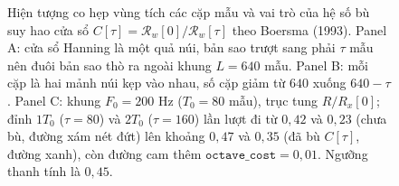 \documentclass[11pt,a4paper]{article}
\begin{document}
\begin{figure}[H]
\centering
\resizebox{0.95\textwidth}{!}{}
\caption{Hiện tượng co hẹp vùng tích các cặp mẫu và vai trò của hệ số bù suy hao cửa sổ $C[\tau] = \mathcal{R}_w[0]/\mathcal{R}_w[\tau]$ theo Boersma (1993). Panel A: cửa sổ Hanning là một quả núi, bản sao trượt sang phải $\tau$ mẫu nên đuôi bản sao thò ra ngoài khung $L = 640$ mẫu. Panel B: mỗi cặp là hai mảnh núi kẹp vào nhau, số cặp giảm từ $640$ xuống $640 - \tau$. Panel C: khung $F_0 = 200\text{ Hz}$ ($T_0 = 80$ mẫu), trục tung $R/R_x[0]$; đỉnh $1T_0$ ($\tau = 80$) và $2T_0$ ($\tau = 160$) lần lượt đi từ $0{,}42$ và $0{,}23$ (chưa bù, đường xám nét đứt) lên khoảng $0{,}47$ và $0{,}35$ (đã bù $C[\tau]$, đường xanh), còn đường cam thêm $\texttt{octave\_cost} = 0{,}01$. Ngưỡng thanh tính là $0{,}45$.}
\label{fig:acf_compensation}
\end{figure}
\end{document}
